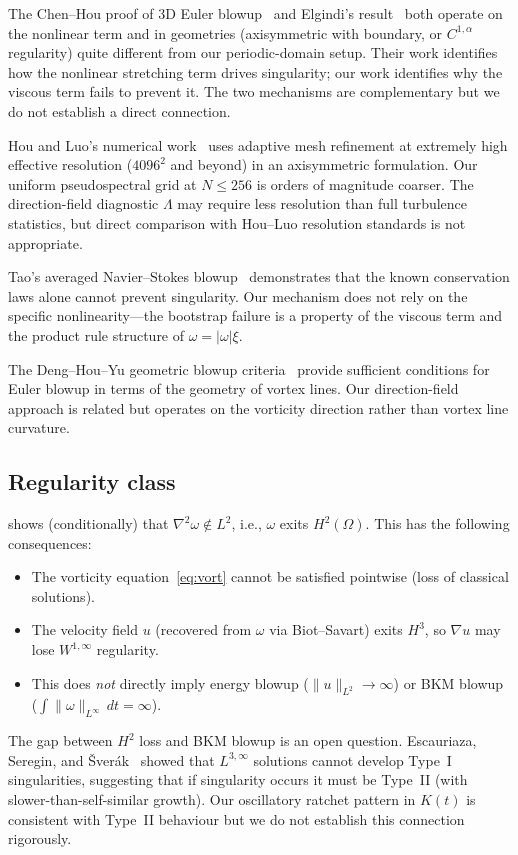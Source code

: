 \documentclass[11pt,a4paper]{article}
\theoremstyle{definition}
\newcommand{\NS}{Navier--Stokes}
\newcommand{\grad}{\nabla}
\newcommand{\lapl}{\nabla^2}
\newcommand{\norm}[1]{\lVert #1 \rVert}
\newcommand{\abs}[1]{\lvert #1 \rvert}
\begin{document}
The Chen--Hou proof of 3D Euler blowup~\cite{ChenHou2023} and
Elgindi's result~\cite{Elgindi2021} both operate on the nonlinear
term and in geometries (axisymmetric with boundary, or
$C^{1,\alpha}$ regularity) quite different from our periodic-domain
setup.  Their work identifies how the nonlinear stretching term
drives singularity; our work identifies why the viscous term fails
to prevent it.  The two mechanisms are complementary but we do not
establish a direct connection.

Hou and Luo's numerical work~\cite{HouLuo2014} uses adaptive mesh
refinement at extremely high effective resolution ($4096^2$ and
beyond) in an axisymmetric formulation.  Our uniform pseudospectral
grid at $N\leq256$ is orders of magnitude coarser.  The
direction-field diagnostic $\Lambda$ may require less resolution than
full turbulence statistics, but direct comparison with Hou--Luo
resolution standards is not appropriate.

Tao's averaged \NS{} blowup~\cite{Tao2016} demonstrates that the
known conservation laws alone cannot prevent singularity.  Our
mechanism does not rely on the specific nonlinearity---the bootstrap
failure is a property of the viscous term and the product rule
structure of $\omega=\abs{\omega}\xi$.

The Deng--Hou--Yu geometric blowup criteria~\cite{DHY2005,DHY2006}
provide sufficient conditions for Euler blowup in terms of the
geometry of vortex lines.  Our direction-field approach is related
but operates on the vorticity direction rather than vortex line
curvature.

\subsection{Regularity class}\label{sec:reg-class}

 shows (conditionally) that $\lapl\omega\notin L^2$,
i.e., $\omega$ exits $H^2(\Omega)$.  This has the following
consequences:
\begin{itemize}
  \item The vorticity equation~\eqref{eq:vort} cannot be satisfied
    pointwise (loss of classical solutions).
  \item The velocity field $u$ (recovered from $\omega$ via
    Biot--Savart) exits $H^3$, so $\grad u$ may lose $W^{1,\infty}$
    regularity.
  \item This does \emph{not} directly imply energy blowup
    ($\norm{u}_{L^2}\to\infty$) or BKM blowup
    ($\int\norm{\omega}_{L^\infty}\,dt=\infty$).
\end{itemize}
The gap between $H^2$ loss and BKM blowup is an open question.
Escauriaza, Seregin, and \v{S}ver\'ak~\cite{ESS2003} showed that
$L^{3,\infty}$ solutions cannot develop Type~I singularities,
suggesting that if singularity occurs it must be Type~II (with
slower-than-self-similar growth).  Our oscillatory ratchet pattern
in $K(t)$ is consistent with Type~II behaviour but we do not
establish this connection rigorously.
\end{document}
